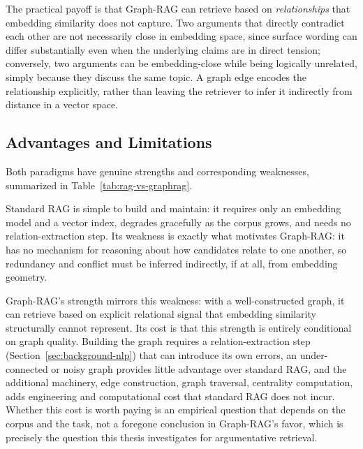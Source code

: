 The practical payoff is that Graph-RAG can retrieve based on \emph{relationships} that embedding
similarity does not capture. Two arguments that directly contradict each other are not
necessarily close in embedding space, since surface wording can differ substantially even when
the underlying claims are in direct tension; conversely, two arguments can be embedding-close
while being logically unrelated, simply because they discuss the same topic. A graph edge encodes
the relationship explicitly, rather than leaving the retriever to infer it indirectly from
distance in a vector space.

\subsection{Advantages and Limitations}
\label{sec:background-tradeoffs}

Both paradigms have genuine strengths and corresponding weaknesses, summarized in
Table~\ref{tab:rag-vs-graphrag}.

Standard RAG is simple to build and maintain: it requires only an embedding model and a vector
index, degrades gracefully as the corpus grows, and needs no relation-extraction step. Its
weakness is exactly what motivates Graph-RAG: it has no mechanism for reasoning about how
candidates relate to one another, so redundancy and conflict must be inferred indirectly, if at
all, from embedding geometry.

Graph-RAG's strength mirrors this weakness: with a well-constructed graph, it can retrieve based
on explicit relational signal that embedding similarity structurally cannot represent. Its cost is
that this strength is entirely conditional on graph quality. Building the graph requires a
relation-extraction step (Section~\ref{sec:background-nlp}) that can introduce its own errors, an
under-connected or noisy graph provides little advantage over standard RAG, and the additional
machinery, edge construction, graph traversal, centrality computation, adds engineering and
computational cost that standard RAG does not incur. Whether this cost is worth paying is an
empirical question that depends on the corpus and the task, not a foregone conclusion in
Graph-RAG's favor, which is precisely the question this thesis investigates for argumentative
retrieval.

